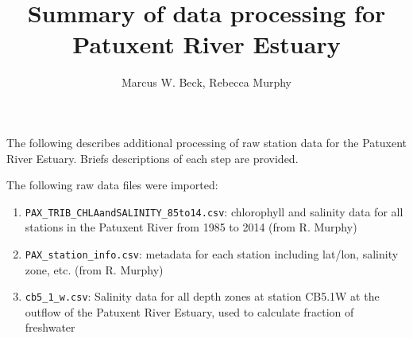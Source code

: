 \documentclass[letterpaper,12pt]{article}\usepackage[]{graphicx}\usepackage[]{color}
\begin{document}
\setlength{\parskip}{5mm}
\setlength{\parindent}{0in}

\title{Summary of data processing for Patuxent River Estuary}
\author{Marcus W. Beck, Rebecca Murphy}
\maketitle

The following describes additional processing of raw station data for the Patuxent River Estuary. Briefs descriptions of each step are provided.

The following raw data files were imported:
\begin{enumerate}
\item \texttt{PAX\_TRIB\_CHLAandSALINITY\_85to14.csv}: chlorophyll and salinity data for all stations in the Patuxent River from 1985 to 2014 (from R. Murphy)
\item \texttt{PAX\_station\_info.csv}: metadata for each station including lat/lon, salinity zone, etc. (from R. Murphy)
\item \texttt{cb5\_1\_w.csv}: Salinity data for all depth zones at station CB5.1W at the outflow of the Patuxent River Estuary, used to calculate fraction of freshwater
\end{enumerate}
\end{document}
